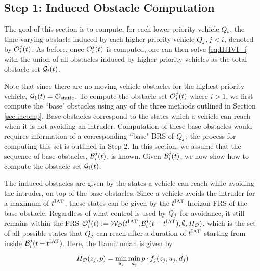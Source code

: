 \subsection{Step 1: Induced Obstacle Computation \label{sec:intruder_iocomp}}
The goal of this section is to compute, for each lower priority vehicle $Q_{i}$, the time-varying obstacle induced by each higher priority vehicle $Q_{j}, j < i$, denoted by $\mathcal{O}_i^j(t)$. As before, once $\mathcal{O}_i^j(t)$ is computed, one can then solve \eqref{eq:HJIVI_i} with the union of all obstacles induced by higher priority vehicles as the total obstacle set $\mathcal{G}_i(t)$. 

Note that since there are no moving vehicle obstacles for the highest priority vehicle, $\mathcal{G}_1(t) = \mathcal{O}_\text{static}$. To compute the obstacle set $\mathcal{O}_i^j(t)$ where $i> 1$, we first compute the ``base" obstacles using any of the three methods outlined in Section \ref{sec:incomp}. Base obstacles correspond to the states which a vehicle can reach when it is not avoiding an intruder. Computation of these base obstacles would requires information of a corresponding ``base" BRS of $Q_{j}$; the process for computing this set is outlined in Step 2. In this section, we assume that the sequence of base obstacles, $\mathcal{B}_i^j(t)$, is known. Given $\mathcal{B}_i^j(t)$, we now show how to compute the obstacle set $\mathcal{G}_i(t)$. 

The induced obstacles are given by the states a vehicle can reach while avoiding the intruder, on top of the base obstacles. Since a vehicle avoids the intruder for a maximum of $t^\text{IAT}$, these states can be given by the $t^\text{IAT}$-horizon FRS of the base obstacle. Regardless of what control is used by $Q_{j}$ for avoidance, it still remains within the FRS $\mathcal{O}_i^j(t) := \mathcal{W}_{\mathcal{O}}(t^\text{IAT}, \mathcal{B}_i^j(t-t^\text{IAT}), \emptyset, H_{\mathcal{O}})$, which is the set of all possible states that $Q_{j}$ can reach after a duration of $t^\text{IAT}$ starting from inside $\mathcal{B}_i^j(t-t^\text{IAT})$. Here, the Hamiltonian is given by

\begin{equation}
H_{\mathcal{O}}(z_j, p) = \min_{u_j} \min_{d_j} p \cdot f_j (z_j, u_j, d_j)
\end{equation}
